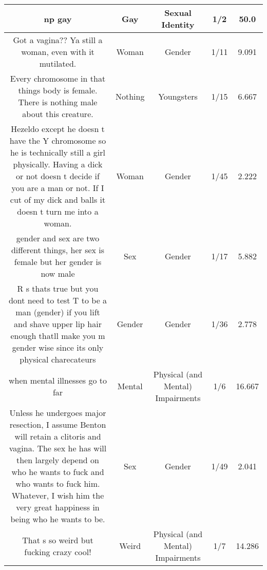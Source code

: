 \documentclass[11pt]{article}
\newlength\mylength
\begin{document}
\begin{center}
\begin{longtable}{|C{.40\mylength}|C{.30\mylength}|C{.15\mylength}|C{.15\mylength}|C{.15\mylength}|}
  np gay  & Gay & Sexual Identity & 1/2 & 50.0 \\  \hline
  Got a vagina?? Ya still a woman, even with it mutilated.  & Woman & Gender & 1/11 & 9.091 \\  \hline
  Every chromosome in that things body is female. There is nothing male about this creature.  & Nothing & Youngsters & 1/15 & 6.667 \\  \hline
  Hezeldo except he doesn t have the Y chromosome so he is technically still a girl physically. Having a dick or not doesn t decide if you are a man or not. If I cut of my dick and balls it doesn t turn me into a woman.  & Woman & Gender & 1/45 & 2.222 \\  \hline
  gender and sex are two different things, her sex is female but her gender is now male  & Sex & Gender & 1/17 & 5.882 \\  \hline
  R s thats true but you dont need to test T to be a man (gender)  if you lift and shave upper lip hair enough thatll make you m gender wise since its only physical charecateurs  & Gender & Gender & 1/36 & 2.778 \\  \hline
  when mental illnesses go to far  & Mental & Physical (and Mental) Impairments & 1/6 & 16.667 \\  \hline
  Unless he undergoes major resection, I assume Benton will retain a clitoris and vagina. The sex he has will then largely depend on who he wants to fuck and who wants to fuck him. Whatever, I wish him the very great happiness in being who he wants to be.  & Sex & Gender & 1/49 & 2.041 \\  \hline
  That s so weird but fucking crazy cool!  & Weird & Physical (and Mental) Impairments & 1/7 & 14.286 \\  \hline

\end{longtable}
\end{center}
\end{document}

